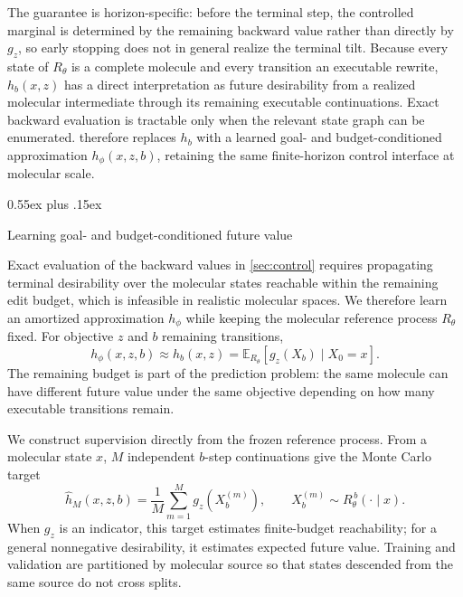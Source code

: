 \documentclass{article}
\makeatletter
\theoremstyle{definition}
\theoremstyle{remark}
\def\subsection{\@startsection{subsection}{2}{\z@}{-1.2ex plus -0.4ex minus -.2ex}%
  {0.55ex plus .15ex}{\normalsize\sc\raggedright}}
\newcommand{\E}{\mathbb{E}}
\makeatother
\begin{document}
The guarantee is horizon-specific: before the terminal step, the controlled marginal is determined by the remaining backward value rather than directly by $g_z$, so early stopping does not in general realize the terminal tilt. Because every state of $R_\theta$ is a complete molecule and every transition an executable rewrite, $h_b(x,z)$ has a direct interpretation as future desirability from a realized molecular intermediate through its remaining executable continuations. Exact backward evaluation is tractable only when the relevant state graph can be enumerated.  therefore replaces $h_b$ with a learned goal- and budget-conditioned approximation $h_\phi(x,z,b)$, retaining the same finite-horizon control interface at molecular scale.

\subsection{Learning goal- and budget-conditioned future value}
\label{sec:hphi}

Exact evaluation of the backward values in \cref{sec:control} requires propagating terminal desirability over the molecular states reachable within the remaining edit budget, which is infeasible in realistic molecular spaces. We therefore learn an amortized approximation $h_\phi$ while keeping the molecular reference process $R_\theta$ fixed. For objective $z$ and $b$ remaining transitions,
\begin{equation}
h_\phi(x,z,b)\approx h_b(x,z)=\E_{R_\theta}\!\left[g_z(X_b)\mid X_0=x\right].
\label{eq:hphi}
\end{equation}
The remaining budget is part of the prediction problem: the same molecule can have different future value under the same objective depending on how many executable transitions remain.

We construct supervision directly from the frozen reference process. From a molecular state $x$, $M$ independent $b$-step continuations give the Monte Carlo target
\begin{equation}
\widehat h_M(x,z,b)=\frac{1}{M}\sum_{m=1}^{M}g_z\!\left(X_b^{(m)}\right),
\qquad
X_b^{(m)}\sim R_\theta^{\,b}(\cdot\mid x).
\label{eq:mctarget}
\end{equation}
When $g_z$ is an indicator, this target estimates finite-budget reachability; for a general nonnegative desirability, it estimates expected future value. Training and validation are partitioned by molecular source so that states descended from the same source do not cross splits.
\end{document}
